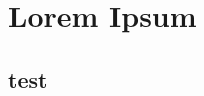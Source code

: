 \documentclass{book}
\begin{document}
\tableofcontents

\chapter{Lorem Ipsum}

\lipsum[1-3]
\section{test}
\lipsum[4-6]
\end{document}
